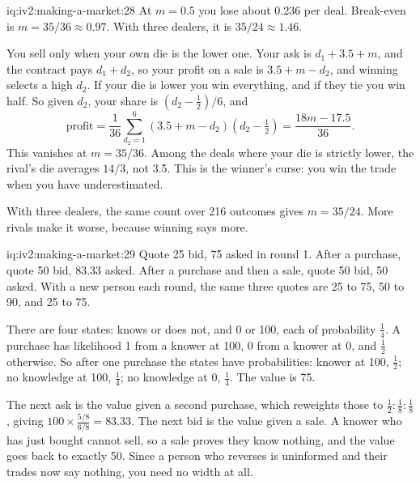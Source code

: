 \begin{solution}{iq:iv2:making-a-market:28}
At $m = 0.5$ you lose about 0.236 per deal. Break-even is $m = 35/36 \approx 0.97$. With three dealers, it is $35/24 \approx 1.46$.

You sell only when your own die is the lower one. Your ask is $d_1 + 3.5 + m$, and the contract pays $d_1 + d_2$, so your profit on a sale is $3.5 + m - d_2$, and winning selects a high $d_2$. If your die is lower you win everything, and if they tie you win half. So given $d_2$, your share is $(d_2 - \tfrac12)/6$, and
\[
\text{profit} = \frac{1}{36} \sum_{d_2 = 1}^6 \left(3.5 + m - d_2\right) \left(d_2 - \tfrac12\right) = \frac{18m - 17.5}{36}.
\]
This vanishes at $m = 35/36$. Among the deals where your die is strictly lower, the rival's die averages $14/3$, not 3.5. This is the winner's curse: you win the trade when you have underestimated.

With three dealers, the same count over 216 outcomes gives $m = 35/24$. More rivals make it worse, because winning says more.

\end{solution}

\begin{solution}{iq:iv2:making-a-market:29}
Quote 25 bid, 75 asked in round 1. After a purchase, quote 50 bid, 83.33 asked. After a purchase and then a sale, quote 50 bid, 50 asked. With a new person each round, the same three quotes are 25 to 75, 50 to 90, and 25 to 75.

There are four states: knows or does not, and 0 or 100, each of probability $\tfrac14$. A purchase has likelihood 1 from a knower at 100, 0 from a knower at 0, and $\tfrac12$ otherwise. So after one purchase the states have probabilities: knower at 100, $\tfrac12$; no knowledge at 100, $\tfrac14$; no knowledge at 0, $\tfrac14$. The value is 75.

The next ask is the value given a second purchase, which reweights those to $\tfrac12 : \tfrac18 : \tfrac18$, giving $100 \times \tfrac{5/8}{6/8} = 83.33$. The next bid is the value given a sale. A knower who has just bought cannot sell, so a sale proves they know nothing, and the value goes back to exactly 50. Since a person who reverses is uninformed and their trades now say nothing, you need no width at all.

\end{solution}

